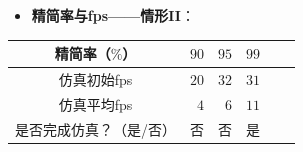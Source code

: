 \begin{frame}
\begin{itemize}
  \item \textbf{精简率与fps——情形II}：
\end{itemize}
\begin{table}[t]
\renewcommand{\arraystretch}{0.5}
\centering
\begin{tabular*}{80mm}{c r r r r r}
\toprule
\hspace{5mm} \small{精简率（$\%$）}           & \small{$90$} & \small{$95$} & \small{$99$} \\
\midrule
\hspace{5mm} \small{仿真初始fps}              & \small{$20$} & \small{$32$} & \small{$31$} \\
\midrule
\hspace{5mm} \small{仿真平均fps}              &  \small{$4$} &  \small{$6$} & \small{$11$} \\
\midrule
\hspace{5mm} \small{是否完成仿真？（是/否）}  &  \small{否}  &  \small{否}  & \small{是}   \\
\bottomrule
\end{tabular*}
\end{table}
\end{frame}

\begin{frame}

\end{frame} 
